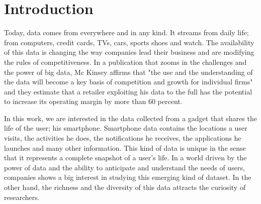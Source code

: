 
\chapter{Introduction} %

\label{Chapter1} %




Today, data comes from everywhere and in any kind. It streams from daily life; from computers, credit cards, TVs, cars,  sports shoes and watch. The availability of this data is changing the way companies lead their business and are modifying the rules of competitiveness. In a publication that zooms in the challenges and the power of big data, Mc Kinsey affirms that "the use and the understanding of the data will become a key basis of competition and growth for individual firms" and they estimate that a retailer exploiting his data to the full has the potential to increase its operating margin by more than $60$ percent.\par

In this work, we are interested in the data collected from a gadget that shares the life of the user; his smartphone. Smartphone data contains the locations a user visits, the activities he does, the notifications he receives, the applications he launches and many other information. This kind of data is unique in the sense that it represents a complete snapshot of a user's life. In a world driven by the power of data and the ability to anticipate and understand the needs of users, companies shows a big interest in studying this emerging kind of dataset. In the other hand, the richness  and the diversity of this data attracts the curiosity of researchers.\par

